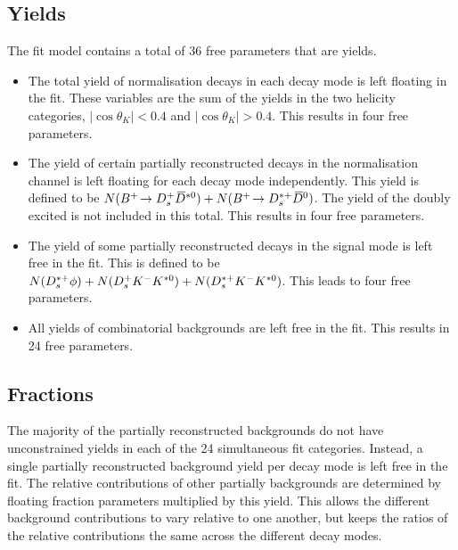 \subsection{Yields}

The fit model contains a total of 36 free parameters that are yields.
\begin{itemize}
\item The total yield of normalisation decays in each \Dsp decay mode is left floating in the fit. These variables are the sum of the yields in the two helicity categories, $|\cos\theta_{K}| < 0.4$ and $|\cos\theta_{K}| > 0.4$. This results in four free parameters.
\item The yield of certain partially reconstructed decays in the normalisation channel is left floating for each \Dsp decay mode independently. This yield is defined to be $N({{{B}^+}}\!\rightarrow {\ensuremath{{D}^+_{s}}}{\ensuremath{{\kern 0.2em\overline{\kern -0.2em D}{}}{}^{*0}}})+ N({{{B}^+}}\!\rightarrow {\ensuremath{{D}^{*+}_{s}}}{\ensuremath{{\kern 0.2em\overline{\kern -0.2em D}{}}{}^0}})$. The yield of the doubly excited \decay{\Bp}{\Dssp\Dstarzb} is not included in this total. This results in four free parameters.
\item The yield of some partially reconstructed decays in the signal mode is left free in the fit. This is defined to be $N({{D}^{*+}_{s}}\phi) + N({{D}^+_{s}}{{K}^-}{{K}^{*0}}) + N({{D}^{*+}_{s}}{{K}^-}{{K}^{*0}})$. This leads to four free parameters. 
\item All yields of combinatorial backgrounds are left free in the fit. This results in 24 free parameters.
\end{itemize}



\subsection{Fractions}




The majority of the partially reconstructed backgrounds do not have unconstrained yields in each of the 24 simultaneous fit categories. 
Instead, a single partially reconstructed background yield per \Dsp decay mode is left free in the fit. The relative contributions of other partially backgrounds are determined by floating fraction parameters multiplied by this yield. 
This allows the different background contributions to vary relative to one another, but keeps the ratios of the relative contributions the same across the different \Dsp decay modes.

